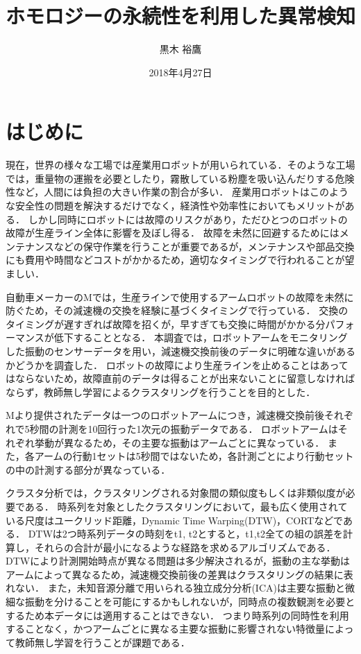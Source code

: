 \documentclass{jarticle}
\title{ホモロジーの永続性を利用した異常検知}
\author{黒木 裕鷹}
\date{2018年4月27日}
\begin{document}
\maketitle
\section{はじめに}
現在，世界の様々な工場では産業用ロボットが用いられている．そのような工場では，重量物の運搬を必要としたり，霧散している粉塵を吸い込んだりする危険性など，人間には負担の大きい作業の割合が多い．
産業用ロボットはこのような安全性の問題を解決するだけでなく，経済性や効率性においてもメリットがある．
しかし同時にロボットには故障のリスクがあり，ただひとつのロボットの故障が生産ライン全体に影響を及ぼし得る．
故障を未然に回避するためにはメンテナンスなどの保守作業を行うことが重要であるが，メンテナンスや部品交換にも費用や時間などコストがかかるため，適切なタイミングで行われることが望ましい．


自動車メーカーのMでは，生産ラインで使用するアームロボットの故障を未然に防ぐため，その減速機の交換を経験に基づくタイミングで行っている．
交換のタイミングが遅すぎれば故障を招くが，早すぎても交換に時間がかかる分パフォーマンスが低下することとなる．
本調査では，ロボットアームをモニタリングした振動のセンサーデータを用い，減速機交換前後のデータに明確な違いがあるかどうかを調査した．
ロボットの故障により生産ラインを止めることはあってはならないため，故障直前のデータは得ることが出来ないことに留意しなければならず，教師無し学習によるクラスタリングを行うことを目的とした．


Mより提供されたデータは一つのロボットアームにつき，減速機交換前後それぞれで5秒間の計測を10回行った1次元の振動データである．
ロボットアームはそれぞれ挙動が異なるため，その主要な振動はアームごとに異なっている．
また，各アームの行動1セットは5秒間ではないため，各計測ごとにより行動セットの中の計測する部分が異なっている．

クラスタ分析では，クラスタリングされる対象間の類似度もしくは非類似度が必要である．
時系列を対象としたクラスタリングにおいて，最も広く使用されている尺度はユークリッド距離，Dynamic Time Warping(DTW)，CORTなどである．
DTWは2つ時系列データの時刻をt1, t2とすると，t1,t2全ての組の誤差を計算し，それらの合計が最小になるような経路を求めるアルゴリズムである．
DTWにより計測開始時点が異なる問題は多少解決されるが，振動の主な挙動はアームによって異なるため，減速機交換前後の差異はクラスタリングの結果に表れない．
また，未知音源分離で用いられる独立成分分析(ICA)は主要な振動と微細な振動を分けることを可能にするかもしれないが，同時点の複数観測を必要とするため本データには適用することはできない．
つまり時系列の同時性を利用することなく，かつアームごとに異なる主要な振動に影響されない特徴量によって教師無し学習を行うことが課題である．
\end{document}
